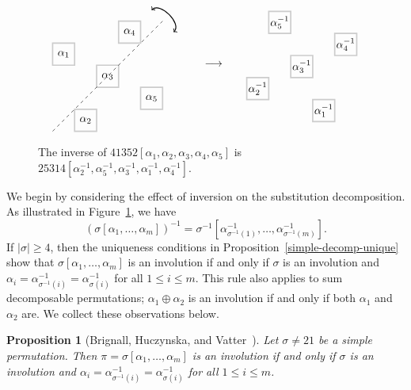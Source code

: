 \documentclass[10pt]{article}
\theoremstyle{plain}
\newtheorem{proposition}[theorem]{Proposition}
\begin{document}
\begin{figure}
	\begin{footnotesize}
	$$
		\begin{array}{ccc}

		\begin{tikzpicture}[scale=.7,baseline=(current bounding box.center)]
		\foreach \x/\y in {1/4, 2/1, 3/3, 4/5, 5/2}{
			\draw[very thick, color=lightgray] (\x,\y) rectangle (\x+1,\y+1);
			\node at (\x+.5,\y+.5) {$\alpha_{\x}$};
		}
		\draw[dashed] (1,1)--(6,6);
		\draw[thick, <->] (5.5,6.5) to[out=45, in=45] (6.5,5.5);
		\end{tikzpicture}

		&
		\quad\longrightarrow\quad
		&
		
		\begin{tikzpicture}[scale=.7,baseline=(current bounding box.center)]
		\foreach \x/\y in {1/4, 2/1, 3/3, 4/5, 5/2}{
			\draw[very thick, color=lightgray] (\y,\x) rectangle (\y+1,\x+1);
			\node at (\y+.5,\x+.5) {$\alpha_{\x}^{-1}$};
		}
		\end{tikzpicture}
	
		\end{array}
	$$
	\end{footnotesize}
	\caption{The inverse of $41352[\alpha_1,\alpha_2,\alpha_3,\alpha_4,\alpha_5]$ is $25314[\alpha_2^{-1},\alpha_5^{-1},\alpha_3^{-1},\alpha_1^{-1},\alpha_4^{-1}]$.}
	\label{figure:inverse-inflation}
\end{figure}

We begin by considering the effect of inversion on the substitution decomposition. As illustrated in Figure~\ref{figure:inverse-inflation}, we have
	\[
	\left(\sigma[\alpha_1,\dots,\alpha_m]\right)^{-1}
	=
	\sigma^{-1}[\alpha_{\sigma^{-1}(1)}^{-1},\dots,\alpha_{\sigma^{-1}(m)}^{-1}].
	\]
If $|\sigma|\ge 4$, then the uniqueness conditions in Proposition~\ref{simple-decomp-unique} show that $\sigma[\alpha_1,\dots,\alpha_m]$ is an involution if and only if $\sigma$ is an involution and $\alpha_i=\alpha_{\sigma^{-1}(i)}^{-1}=\alpha_{\sigma(i)}^{-1}$ for all $1 \leq i \leq m$. This rule also applies to sum decomposable permutations; $\alpha_1\oplus\alpha_2$ is an involution if and only if both $\alpha_1$ and $\alpha_2$ are. We collect these observations below.

\begin{proposition}[Brignall, Huczynska, and Vatter~\cite{brignall:simple-permutat:}]
\label{involution-decomp-1}
Let $\sigma\neq 21$ be a simple permutation. Then $\pi=\sigma[\alpha_1,\dots,\alpha_m]$ is an involution if and only if $\sigma$ is an involution and $\alpha_i=\alpha_{\sigma^{-1}(i)}^{-1}=\alpha_{\sigma(i)}^{-1}$ for all $1 \leq i \leq m$.
\end{proposition}
\end{document}
